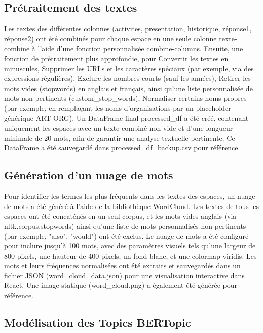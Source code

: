 \documentclass[mstat,12pt]{unswthesis}
\begin{document}
\subsection{Prétraitement des textes}

Les textes des différentes colonnes (activites, presentation, historique, réponse1, réponse2) ont été combinés pour chaque espace en une seule colonne texte-combine à l'aide d'une fonction personnalisée combine-columns.
Ensuite, une fonction de prétraitement plus approfondie, pour Convertir les textes en minuscules, Supprimer les URLs et les caractères spéciaux (par exemple, via des expressions régulières), Exclure les nombres courts (sauf les années), Retirer les mots vides (stopwords) en anglais et français, ainsi qu'une liste personnalisée de mots non pertinents (custom\_stop\_words), Normaliser certains noms propres (par exemple, en remplaçant les noms d'organisations par un placeholder générique ART-ORG).
Un DataFrame final processed\_df a été créé, contenant uniquement les espaces avec un texte combiné non vide et d'une longueur minimale de 20 mots, afin de garantir une analyse textuelle pertinente. Ce DataFrame a été sauvegardé dans processed\_df\_backup.csv pour référence.

\subsection{Génération d'un nuage de mots}

Pour identifier les termes les plus fréquents dans les textes des espaces, un nuage de mots a été généré à l'aide de la bibliothèque WordCloud. Les textes de tous les espaces ont été concaténés en un seul corpus, et les mots vides anglais (via nltk.corpus.stopwords) ainsi qu'une liste de mots personnalisés non pertinents (par exemple, "also", "would") ont été exclus. Le nuage de mots a été configuré pour inclure jusqu'à 100 mots, avec des paramètres visuels tels qu'une largeur de 800 pixels, une hauteur de 400 pixels, un fond blanc, et une colormap viridis. Les mots et leurs fréquences normalisées ont été extraits et sauvegardés dans un fichier JSON (word\_cloud\_data.json) pour une visualisation interactive dans React.
Une image statique (word\_cloud.png) a également été générée pour référence.

\subsection{Modélisation des Topics BERTopic}
\end{document}
